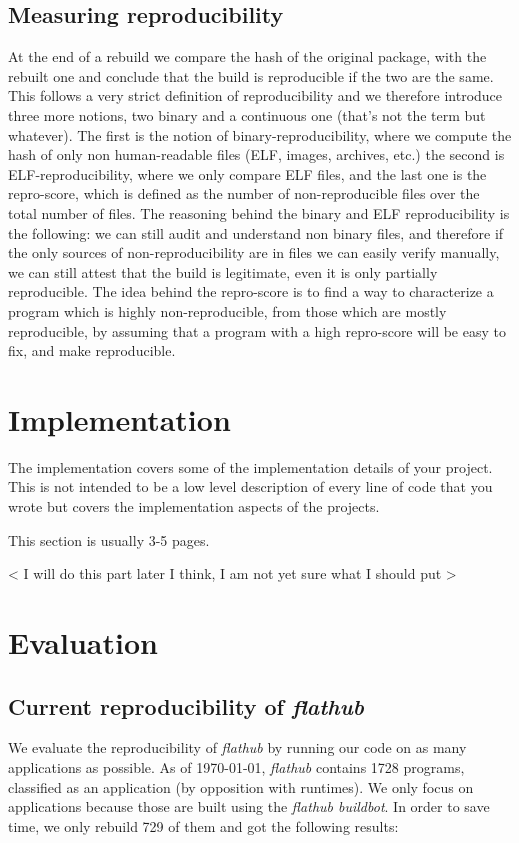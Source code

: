 \documentclass[a4paper,11pt,oneside]{report}
\newcommand{\fh}{\emph{flathub}\xspace}
\newcommand{\fhbb}{\emph{flathub buildbot}\xspace}
\begin{document}
\section{Measuring reproducibility}
At the end of a rebuild we compare the hash of the original package, with the
rebuilt one and conclude that the build is reproducible if the two are the
same. This follows a very strict definition of reproducibility and we therefore
introduce three more notions, two binary and a continuous one (that's not the
term but whatever). The first is the notion of binary-reproducibility, where we
compute the hash of only non human-readable files (ELF, images, archives, etc.)
the second is ELF-reproducibility, where we only compare ELF files, and the
last one is the repro-score, which is defined as the number of non-reproducible
files over the total number of files.
The reasoning behind the binary and ELF reproducibility is the following: we
can still audit and understand non binary files, and therefore if the only
sources of non-reproducibility are in files we can easily verify manually, we
can still attest that the build is legitimate, even it is only partially
reproducible.
The idea behind the repro-score is to find a way to characterize a program
which is highly non-reproducible, from those which are mostly reproducible, by
assuming that a program with a high repro-score will be easy to fix, and make
reproducible.


\chapter{Implementation}

The implementation covers some of the implementation details of your project.
This is not intended to be a low level description of every line of code that
you wrote but covers the implementation aspects of the projects.

This section is usually 3-5 pages.

< I will do this part later I think, I am not yet sure what I should put >

\chapter{Evaluation}

\section{Current reproducibility of \fh}
We evaluate the reproducibility of \fh by running our code on as many
applications as possible. As of \today, \fh contains 1728 programs, classified
as an application (by opposition with runtimes). We only focus on applications
because those are built using the \fhbb. In order to save time, we only rebuild
729 of them and got the following results:
\end{document}
